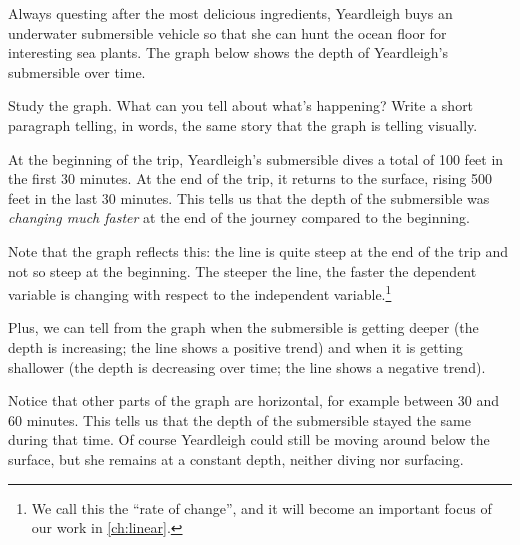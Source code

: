\begin{boxedexplore}
Always questing after the most delicious ingredients, Yeardleigh buys an underwater submersible vehicle so that she can hunt the ocean floor for interesting sea plants. The graph below shows the depth of Yeardleigh's submersible over time.

Study the graph. What can you tell about what's happening? Write a short paragraph telling, in words, the same story that the graph is telling visually.

\begin{center}
\end{center}
\end{boxedexplore}

At the beginning of the trip, Yeardleigh's submersible dives a total of 100 feet in the first 30 minutes. At the end of the trip, it returns to the surface, rising 500 feet in the last 30 minutes. This tells us that the depth of the submersible was \textit{changing much faster} at the end of the journey compared to the beginning.

Note that the graph reflects this: the line is quite steep at the end of the trip and not so steep at the beginning. The steeper the line, the faster the dependent variable is changing with respect to the independent variable.\footnote{We call this the ``rate of change'', and it will become an important focus of our work in \cref{ch:linear}.}

Plus, we can tell from the graph when the submersible is getting deeper (the depth is increasing; the line shows a positive trend) and when it is getting shallower (the depth is decreasing over time; the line shows a negative trend).

Notice that other parts of the graph are horizontal, for example between 30 and 60 minutes. This tells us that the depth of the submersible stayed the same during that time. Of course Yeardleigh could still be moving around below the surface, but she remains at a constant depth, neither diving nor surfacing.

